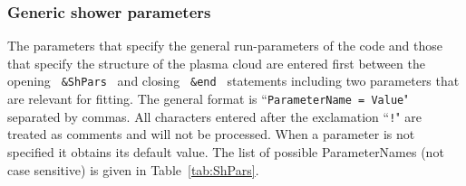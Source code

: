 \documentclass[pdftex,dvipsnames,usenames,fleqn,12pt]{article}
\def\tabref#1{Table~\ref{tab:#1}}
\begin{document}
\subsubsection{Generic shower parameters}

The parameters that specify the general run-parameters of the code and those that specify the structure of the plasma cloud are entered first between the opening \verb< &ShPars < and closing \verb< &end < statements including two parameters that are relevant for fitting. The general format is ``{\tt ParameterName = Value}" separated by commas. All characters entered after the exclamation ``{\tt!}" are treated as comments and will not be processed. When a parameter is not specified it obtains its default value. The list of possible ParameterNames (not case sensitive) is given in \tabref{ShPars}.
\end{document}
